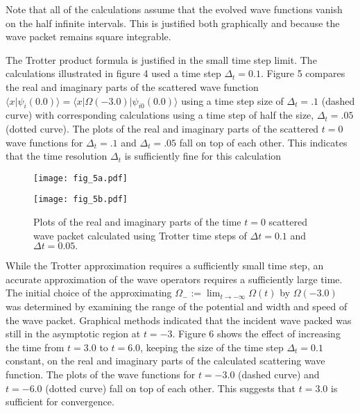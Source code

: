 \documentclass[aps,prc,reprint,noshowpacs,groupedaddress,onecolumn]{revtex4}
\begin{document}
Note that all of the calculations assume that the evolved wave
functions vanish on the half infinite intervals.  This is justified
both graphically and because the wave packet remains square
integrable.

The Trotter product formula is justified in the small time step limit.
The calculations illustrated in figure 4 used a time step
$\Delta_t=0.1$.  Figure 5 compares the real and imaginary parts of
the scattered wave function $\langle x \vert \psi_{i}(0.0)\rangle= 
\langle x \vert \Omega (-3.0)\vert \psi_{i0}(0.0)\rangle$
using a time step size of $\Delta_t=.1$ (dashed curve) with
corresponding calculations using a time step of half the size,
$\Delta_t=.05$ (dotted curve).  The plots of the real and imaginary
parts of the scattered $t=0$ wave functions for $\Delta_t=.1$ and
$\Delta_t=.05$ fall on top of each other.  This indicates that the
time resolution $\Delta_t$ is sufficiently fine for this calculation
\begin{figure}
\caption{Plots of the real and imaginary parts of the time $t=0$
scattered wave packet
calculated using Trotter time steps of $\Delta t =0.1$ and
$\Delta t =0.05.$}
\begin{minipage}[t]{.45\linewidth}
\centering
\texttt{[image: fig\_5a.pdf]}
\end{minipage}
\begin{minipage}[t]{.45\linewidth}
\centering
\texttt{[image: fig\_5b.pdf]}
\end{minipage}
\label{figure 5}
\end{figure}  

While the Trotter approximation requires a sufficiently small time
step, an accurate approximation of the wave operators requires a
sufficiently large time.  The initial choice of the approximating
$\Omega_- := \lim_{t \to -\infty}\Omega(t)$ by $\Omega (-3.0)$ was
determined by examining the range of the potential and width and speed
of the wave packet.  Graphical methods indicated that the incident wave
packed was still in the asymptotic region at $t=-3$.  
Figure 6 shows the
effect of increasing the time from $t=3.0$ to $t=6.0$, keeping the
size of the time step $\Delta_t=0.1$ constant, on the real and
imaginary parts of the calculated scattering wave function.  The plots
of the wave functions for $t=-3.0$ (dashed curve) and $t=-6.0$ (dotted
curve) fall on top of each other.  This suggests that $t=3.0$ is
sufficient for convergence.
\end{document}
